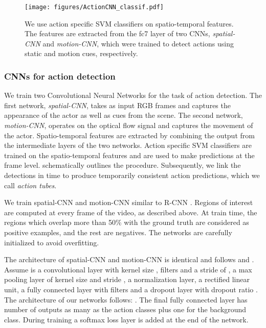 \documentclass[10pt,twocolumn,letterpaper]{article}
\begin{document}
\begin{figure}[t]
\begin{center}
  \texttt{[image: figures/ActionCNN\_classif.pdf]}
\end{center}
   \caption{We use action specific SVM classifiers on spatio-temporal features. The features are extracted from the fc7 layer of two CNNs, \textit{spatial-CNN} and \textit{motion-CNN}, which were trained to detect actions using static and motion cues, respectively.}
\end{figure}


\subsubsection{CNNs for action detection} 

We train two Convolutional Neural Networks for the task of action detection. The first network, \textit{spatial-CNN}, takes as input RGB frames and captures the appearance of the actor as well as cues from the scene. The second network, \textit{motion-CNN}, operates on the optical flow signal and captures the movement of the actor. Spatio-temporal features are extracted by combining the output from the intermediate layers of the two networks. Action specific SVM classifiers are trained on the spatio-temporal features and are used to make predictions at the frame level.  schematically outlines the procedure. Subsequently, we link the detections in time to produce temporarily consistent action predictions, which we call \textit{action tubes}.

We train  spatial-CNN and motion-CNN similar to R-CNN \cite{girshick2014rcnn}. Regions of interest are computed at every frame of the video, as described above. At train time, the regions which overlap more than 50\% with the ground truth are considered as positive examples, and the rest are negatives. The networks are carefully initialized to avoid overfitting. 

The architecture of spatial-CNN and motion-CNN is identical and follows \cite{krizhevsky2012imagenet} and \cite{zeiler2014}. Assume  is a convolutional layer with kernel size ,  filters and a stride of ,  a max pooling layer of kernel size  and stride ,  a normalization layer,  a rectified linear unit,  a fully connected layer with  filters and  a dropout layer with dropout ratio . The architecture of our networks follows: . The final fully connected layer has number of outputs as many as the action classes plus one for the background class. During training a softmax loss layer is added at the end of the network.
\end{document}
